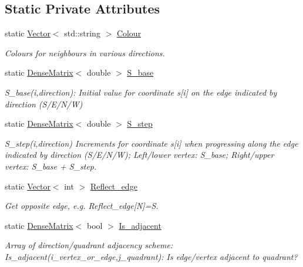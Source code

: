 \subsection*{Static Private Attributes}
\begin{DoxyCompactItemize}
\item 
static \hyperlink{classoomph_1_1Vector}{Vector}$<$ std\+::string $>$ \hyperlink{classoomph_1_1QuadTree_ab882ad3e12fec441f97ef526bae1f497}{Colour}
\begin{DoxyCompactList}\small\item\em Colours for neighbours in various directions. \end{DoxyCompactList}\item 
static \hyperlink{classoomph_1_1DenseMatrix}{Dense\+Matrix}$<$ double $>$ \hyperlink{classoomph_1_1QuadTree_a89acef2846ba5c3f00e424575385527e}{S\+\_\+base}
\begin{DoxyCompactList}\small\item\em S\+\_\+base(i,direction)\+: Initial value for coordinate s\mbox{[}i\mbox{]} on the edge indicated by direction (S/\+E/\+N/W) \end{DoxyCompactList}\item 
static \hyperlink{classoomph_1_1DenseMatrix}{Dense\+Matrix}$<$ double $>$ \hyperlink{classoomph_1_1QuadTree_a24da4f560f767a69d2dfbee82e404ad9}{S\+\_\+step}
\begin{DoxyCompactList}\small\item\em S\+\_\+step(i,direction) Increments for coordinate s\mbox{[}i\mbox{]} when progressing along the edge indicated by direction (S/\+E/\+N/W); Left/lower vertex\+: S\+\_\+base; Right/upper vertex\+: S\+\_\+base + S\+\_\+step. \end{DoxyCompactList}\item 
static \hyperlink{classoomph_1_1Vector}{Vector}$<$ int $>$ \hyperlink{classoomph_1_1QuadTree_a40d403ca6058b1f8cdef2e0b21972050}{Reflect\+\_\+edge}
\begin{DoxyCompactList}\small\item\em Get opposite edge, e.\+g. Reflect\+\_\+edge\mbox{[}N\mbox{]}=S. \end{DoxyCompactList}\item 
static \hyperlink{classoomph_1_1DenseMatrix}{Dense\+Matrix}$<$ bool $>$ \hyperlink{classoomph_1_1QuadTree_abb32869f7b5df6755d092183d6f1172e}{Is\+\_\+adjacent}
\begin{DoxyCompactList}\small\item\em Array of direction/quadrant adjacency scheme\+: Is\+\_\+adjacent(i\+\_\+vertex\+\_\+or\+\_\+edge,j\+\_\+quadrant)\+: Is edge/vertex adjacent to quadrant? \end{DoxyCompactList}\item 

\end{DoxyCompactItemize}
